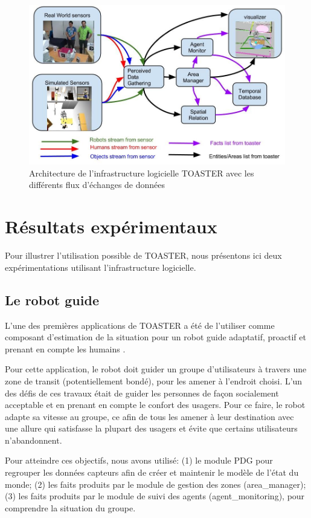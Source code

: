 \documentclass[a4paper,11pt,twoside]{StyleThese}
\begin{document}
\begin{figure}[ht!]
 \centering
  \includegraphics[width=0.99\linewidth]{./img/toasterArch.jpg} 
  \caption {Architecture de l'infrastructure logicielle TOASTER avec les différents flux d'échanges de données}
  \label{fig:toasterArch}
\end{figure}

\section{Résultats expérimentaux}
Pour illustrer l'utilisation possible de TOASTER, nous présentons ici deux expérimentations utilisant l'infrastructure logicielle.

\subsection{Le robot guide}

L'une des premières applications de TOASTER a été de l'utiliser comme composant d'estimation de la situation pour un robot guide adaptatif, proactif et prenant en compte les humains \cite{fioreicsr2015}.

Pour cette application, le robot doit guider un groupe d'utilisateurs à travers une zone de transit (potentiellement bondé), pour les amener à l'endroit choisi.
L'un des défis de ces travaux était de guider les personnes de façon socialement acceptable et en prenant en compte le confort des usagers.
Pour ce faire, le robot adapte sa vitesse au groupe, ce afin de tous les amener à leur destination avec une allure qui satisfasse la plupart des usagers et évite que certains utilisateurs n'abandonnent.

Pour atteindre ces objectifs, nous avons utilisé: (1) le module PDG pour regrouper les données capteurs afin de créer et maintenir le modèle de l'état du monde; (2) les faits produits par le module de gestion des zones (area\_manager); (3) les faits produits par le module de suivi des agents (agent\_monitoring), pour comprendre la situation du groupe. 
\end{document}
